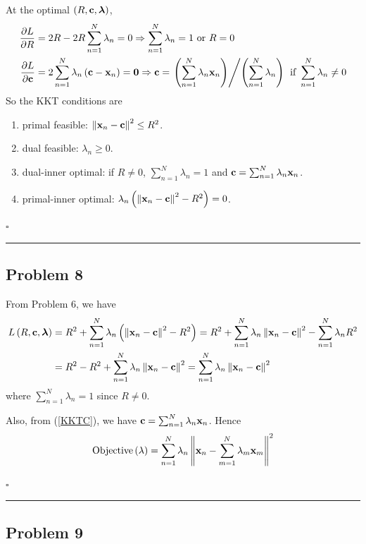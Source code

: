 \documentclass[12pt]{article}
\newcommand*{\QEDB}{\hfill\ensuremath{\square}}
\newcommand{\ParTh}[1]{\left(#1\right)}
\newcommand{\BF}[1]{{\bf#1}}
\newcommand{\VecAbsVal}[1]{\left\|#1\right\|}
\newcommand{\Divide}[2]{\left.#1\middle/#2\right.}
\newcommand{\horrule}[1]{\rule{\linewidth}{#1}}
\begin{document}
At the optimal $(R,\BF{c},\bm{\lambda})$,
\begin{align}
\dfrac{\partial L}{\partial R}&=2R-2R\sum_{n=1}^{N}\lambda_n=0\Rightarrow\sum_{n=1}^{N}\lambda_n=1\text{ or }R=0\\
\label{KKTC}
\dfrac{\partial L}{\partial\BF{c}}&=2\sum_{n=1}^{N}\lambda_{n}\ParTh{\BF{c}-\BF{x}_{n}}=\BF{0}\Rightarrow\BF{c}=\Divide{\ParTh{\sum_{n=1}^{N}\lambda_n\BF{x}_n}}{\ParTh{\sum_{n=1}^{N}\lambda_n}}\text{ if }\sum_{n=1}^{N}\lambda_n\neq0
\end{align}
So the KKT conditions are
\begin{enumerate}
	\item primal feasible: $\VecAbsVal{\BF{x}_n-\BF{c}}^2\leq R^2$.
	\item dual feasible: $\lambda_n\geq0$.
	\item dual-inner optimal: if $R\neq0$, $\sum_{n=1}^{N}\lambda_n=1$ and $\BF{c}=\sum_{n=1}^{N}\lambda_n\BF{x}_n$.
	\item primal-inner optimal: $\lambda_n\ParTh{\VecAbsVal{\BF{x}_n-\BF{c}}^2-R^2}=0$.
\end{enumerate}

\QEDB

\horrule{0.5pt}

\subsection*{Problem 8}

From Problem 6, we have
\begin{align}
L\ParTh{R,\BF{c},\bm{\lambda}}&=R^2+\sum_{n=1}^{N}\lambda_n\ParTh{\VecAbsVal{\BF{x}_n-\BF{c}}^2-R^2}=R^2+\sum_{n=1}^{N}\lambda_n\VecAbsVal{\BF{x}_n-\BF{c}}^2-\sum_{n=1}^{N}\lambda_nR^2\\
&=R^2-R^2+\sum_{n=1}^{N}\lambda_n\VecAbsVal{\BF{x}_n-\BF{c}}^2=\sum_{n=1}^{N}\lambda_n\VecAbsVal{\BF{x}_n-\BF{c}}^2
\end{align}
where $\sum_{n=1}^{N}\lambda_n=1$ since $R\neq0$.

Also, from (\ref{KKTC}), we have $\BF{c}=\sum_{n=1}^{N}\lambda_n\BF{x}_n$. Hence
\begin{align}
\text{Objective}\ParTh{\lambda}=\sum_{n=1}^{N}\lambda_n\VecAbsVal{\BF{x}_n-\sum_{m=1}^{N}\lambda_m\BF{x}_m}^2
\end{align}

\QEDB

\horrule{0.5pt}

\subsection*{Problem 9}
\end{document}
